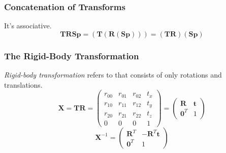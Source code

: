 \documentclass[10pt, a4paper]{article}
\begin{document}
            \subsubsection{Concatenation of Transforms}
                It's associative.
                $$\textbf{T}\textbf{R}\textbf{S}\textbf{p} = (\textbf{T}(\textbf{R}(\textbf{S}\textbf{p}))) = (\textbf{T}\textbf{R})(\textbf{S}\textbf{p})$$
                \newpage
        
            \subsubsection{The Rigid-Body Transformation}
                \emph{Rigid-body transformation} refers to that consists of only rotations and translations.\newline
                \begin{equation*}
                    \textbf{X} = \textbf{T}\textbf{R}=
                    \begin{pmatrix}
                        r_{00} & r_{01} & r_{02} & t_x\\
                        r_{10} & r_{11} & r_{12} & t_y\\
                        r_{20} & r_{21} & r_{22} & t_z\\
                        0 & 0 & 0 & 1
                    \end{pmatrix}
                    =
                    \begin{pmatrix}
                        \textbf{R} & \textbf{t}\\
                        \textbf{0}^T & 1
                    \end{pmatrix}
                \end{equation*}
                \newline
                \begin{equation*}
                    \textbf{X}^{-1} = 
                    \begin{pmatrix}
                        \textbf{R}^T & -\textbf{R}^T\textbf{t}\\
                        \textbf{0}^T & 1
                    \end{pmatrix}
                \end{equation*}
            
\end{document}
